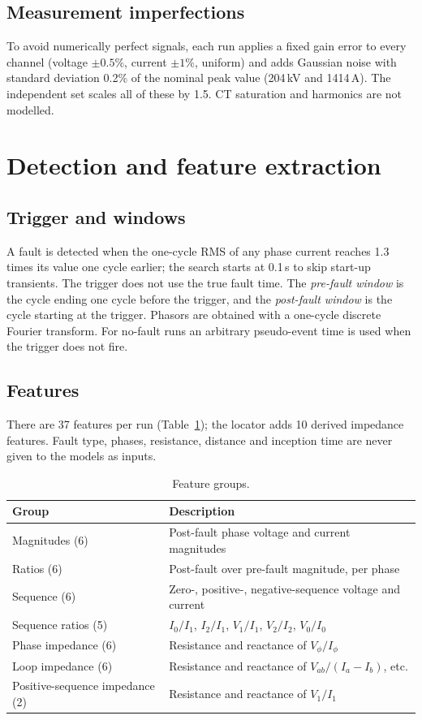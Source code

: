\documentclass[11pt,a4paper]{article}
\begin{document}
\subsection{Measurement imperfections}
To avoid numerically perfect signals, each run applies a fixed gain error to every channel (voltage $\pm0.5\%$, current $\pm1\%$, uniform) and adds Gaussian noise with standard deviation 0.2\% of the nominal peak value (204\,kV and 1414\,A). The independent set scales all of these by 1.5. CT saturation and harmonics are not modelled.

\section{Detection and feature extraction}\label{sec:features}
\subsection{Trigger and windows}
A fault is detected when the one-cycle RMS of any phase current reaches 1.3 times its value one cycle earlier; the search starts at 0.1\,s to skip start-up transients. The trigger does not use the true fault time. The \emph{pre-fault window} is the cycle ending one cycle before the trigger, and the \emph{post-fault window} is the cycle starting at the trigger. Phasors are obtained with a one-cycle discrete Fourier transform. For no-fault runs an arbitrary pseudo-event time is used when the trigger does not fire.

\subsection{Features}
There are 37 features per run (Table~\ref{tab:feat}); the locator adds 10 derived impedance features. Fault type, phases, resistance, distance and inception time are never given to the models as inputs.

\begin{table}[H]\centering\small
\caption{Feature groups.}\label{tab:feat}
\begin{tabular}{ll}\toprule
Group & Description\\\midrule
Magnitudes (6) & Post-fault phase voltage and current magnitudes\\
Ratios (6) & Post-fault over pre-fault magnitude, per phase\\
Sequence (6) & Zero-, positive-, negative-sequence voltage and current\\
Sequence ratios (5) & $I_0/I_1$, $I_2/I_1$, $V_1/I_1$, $V_2/I_2$, $V_0/I_0$\\
Phase impedance (6) & Resistance and reactance of $V_\phi/I_\phi$\\
Loop impedance (6) & Resistance and reactance of $V_{ab}/(I_a-I_b)$, etc.\\
Positive-sequence impedance (2) & Resistance and reactance of $V_1/I_1$\\\bottomrule
\end{tabular}
\end{table}
\end{document}
